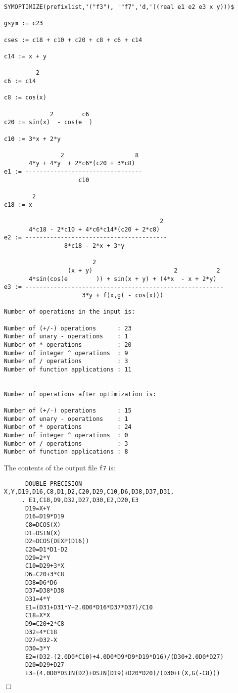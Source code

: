 {{\begin{verbatim}
SYMOPTIMIZE(prefixlist,'("f3"), '"f7",'d,'((real e1 e2 e3 x y)))$

gsym := c23

cses := c18 + c10 + c20 + c8 + c6 + c14

c14 := x + y

         2
c6 := c14

c8 := cos(x)

             2        c6
c20 := sin(x)  - cos(e  )

c10 := 3*x + 2*y

                2                    8
       4*y + 4*y  + 2*c6*(c20 + 3*c8)
e1 := ---------------------------------
                     c10

        2
c18 := x

                                            2
       4*c18 - 2*c10 + 4*c6*c14*(c20 + 2*c8)
e2 := ----------------------------------------
                 8*c18 - 2*x + 3*y

                         2
                  (x + y)                       2           2
       4*sin(cos(e        )) + sin(x + y) + (4*x  - x + 2*y)
e3 := --------------------------------------------------------
                      3*y + f(x,g( - cos(x)))

Number of operations in the input is: 

Number of (+/-) operations      : 23
Number of unary - operations    : 1
Number of * operations          : 20
Number of integer ^ operations  : 9
Number of / operations          : 3
Number of function applications : 11


Number of operations after optimization is:

Number of (+/-) operations      : 15
Number of unary - operations    : 1
Number of * operations          : 24
Number of integer ^ operations  : 0
Number of / operations          : 3
Number of function applications : 8
\end{verbatim}}

The contents of the output file {\tt f7} is:
{\small
\begin{verbatim}
      DOUBLE PRECISION X,Y,D19,D16,C8,D1,D2,C20,D29,C10,D6,D38,D37,D31,
     . E1,C18,D9,D32,D27,D30,E2,D20,E3
      D19=X+Y
      D16=D19*D19
      C8=DCOS(X)
      D1=DSIN(X)
      D2=DCOS(DEXP(D16))
      C20=D1*D1-D2
      D29=2*Y
      C10=D29+3*X
      D6=C20+3*C8
      D38=D6*D6
      D37=D38*D38
      D31=4*Y
      E1=(D31+D31*Y+2.0D0*D16*D37*D37)/C10
      C18=X*X
      D9=C20+2*C8
      D32=4*C18
      D27=D32-X
      D30=3*Y
      E2=(D32-(2.0D0*C10)+4.0D0*D9*D9*D19*D16)/(D30+2.0D0*D27)
      D20=D29+D27
      E3=(4.0D0*DSIN(D2)+DSIN(D19)+D20*D20)/(D30+F(X,G(-C8)))
\end{verbatim}
\begin{flushright}
$\Box$
\end{flushright}}

}
